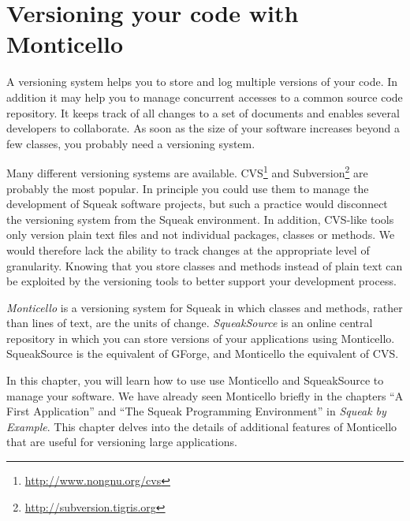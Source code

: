 \documentclass[a4paper,10pt,twoside]{book}
\begin{document}
	\sloppy
\fi

\newcommand{\MC}{Monticello\xspace}
\newcommand{\MCB}{\MC browser\xspace}
\newcommand{\RI}{repository inspector\xspace}

\chapter{Versioning your code with \MC}

A versioning system helps you to store and log multiple versions of your code. In addition it may help you to manage concurrent accesses to a common source code repository. It keeps track of all changes to a set of documents and enables several developers to collaborate. As soon as the size of your software increases beyond a few classes, you probably need a versioning system.

Many different versioning systems are available. CVS\footnote{\url{http://www.nongnu.org/cvs}} and Subversion\footnote{\url{http://subversion.tigris.org}} are probably the most popular.
In principle you could use them to manage the development of Squeak software projects, but such a practice would disconnect the versioning system from the Squeak environment.
In addition, CVS-like tools only version plain text files and not individual packages, classes or methods. We would therefore lack the ability to track changes at the appropriate level of granularity. Knowing that you store classes and methods instead of plain text can be exploited by the versioning tools to better support your development process.


\emph{\MC{}} is  a versioning system for Squeak in which classes and methods, rather than lines of text,
are the units of change. \emph{SqueakSource} is an online central repository in which you can store versions of your applications using \MC. SqueakSource is the equivalent of GForge, and \MC the equivalent of CVS. 

In this chapter, you will learn how to use use \MC and SqueakSource to manage your software. We have already seen \MC briefly in the chapters ``A First Application'' and ``The Squeak Programming Environment'' in \emph{Squeak by Example}. This chapter delves into the details of additional features of \MC that are useful for versioning large applications.
\end{document}

